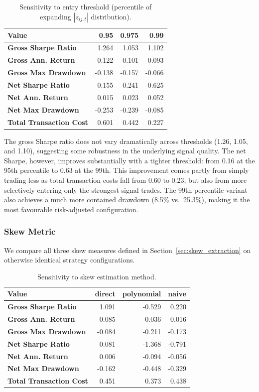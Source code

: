 \documentclass[12pt, a4paper]{article}
\begin{document}
\begin{table}[h]
\centering
\caption{Sensitivity to entry threshold (percentile of expanding $|z_{ij,t}|$ distribution).}
\label{tab:entry_threshold_sens}
\begin{tabular}{lrrr}
\toprule
Value & 0.95 & 0.975 & 0.99 \\
\midrule
\textbf{Gross Sharpe Ratio} & 1.264 & 1.053 & 1.102 \\
\textbf{Gross Ann. Return} & 0.122 & 0.101 & 0.093 \\
\textbf{Gross Max Drawdown} & -0.138 & -0.157 & -0.066 \\
\textbf{Net Sharpe Ratio} & 0.155 & 0.241 & 0.625 \\
\textbf{Net Ann. Return} & 0.015 & 0.023 & 0.052 \\
\textbf{Net Max Drawdown} & -0.253 & -0.239 & -0.085 \\
\textbf{Total Transaction Cost} & 0.601 & 0.442 & 0.227 \\
\bottomrule
\end{tabular}
\end{table}

The gross Sharpe ratio does not vary dramatically across thresholds (1.26, 1.05, and 1.10), suggesting some robustness in the underlying signal quality. The net Sharpe, however, improves substantially with a tighter threshold: from 0.16 at the 95th percentile to 0.63 at the 99th. This improvement comes partly from simply trading less as total transaction costs fall from 0.60 to 0.23, but also from more selectively entering only the strongest-signal trades. The 99th-percentile variant also achieves a much more contained drawdown (8.5\% vs.\ 25.3\%), making it the most favourable risk-adjusted configuration.

\subsubsection{Skew Metric}

We compare all three skew measures defined in Section~\ref{sec:skew_extraction} on otherwise identical strategy configurations.

\begin{table}[h]
\centering
\caption{Sensitivity to skew estimation method.}
\label{tab:skew_method_sens}
\begin{tabular}{lrrr}
\toprule
Value & direct & polynomial & naive \\
\midrule
\textbf{Gross Sharpe Ratio} & 1.091 & -0.529 & 0.220 \\
\textbf{Gross Ann. Return} & 0.085 & -0.036 & 0.016 \\
\textbf{Gross Max Drawdown} & -0.084 & -0.211 & -0.173 \\
\textbf{Net Sharpe Ratio} & 0.081 & -1.368 & -0.791 \\
\textbf{Net Ann. Return} & 0.006 & -0.094 & -0.056 \\
\textbf{Net Max Drawdown} & -0.162 & -0.448 & -0.329 \\
\textbf{Total Transaction Cost} & 0.451 & 0.373 & 0.438 \\
\bottomrule
\end{tabular}
\end{table}
\end{document}
